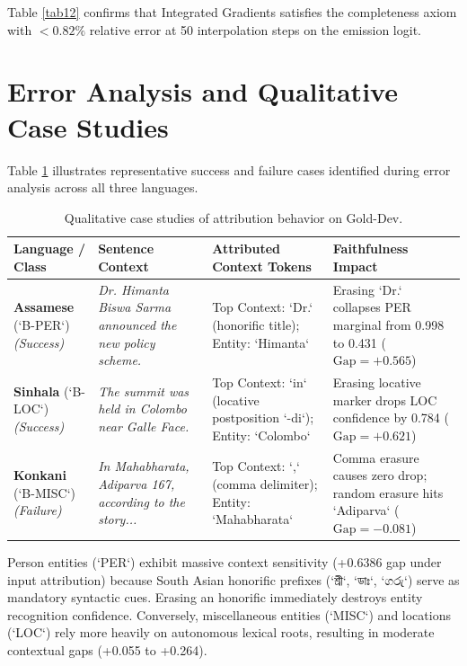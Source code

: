 \documentclass[default,iicol]{sn-jnl}
\begin{document}
Table \ref{tab12} confirms that Integrated Gradients satisfies the completeness axiom with $<0.82\%$ relative error at 50 interpolation steps on the emission logit.

\section{Error Analysis and Qualitative Case Studies}\label{sec7}

Table \ref{tab15} illustrates representative success and failure cases identified during error analysis across all three languages.

\begin{table}[t]
\caption{Qualitative case studies of attribution behavior on Gold-Dev.}\label{tab15}
\centering
\begin{tabular}{p{}p{}p{}p{}}
\toprule
Language / Class & Sentence Context & Attributed Context Tokens & Faithfulness Impact \\
\midrule
\textbf{Assamese} (`B-PER`) \textit{(Success)} & \textit{Dr. Himanta Biswa Sarma announced the new policy scheme.} & Top Context: `Dr.` (honorific title); Entity: `Himanta` & Erasing `Dr.` collapses PER marginal from 0.998 to 0.431 ($\text{Gap} = \mathbf{+0.565}$) \\
\textbf{Sinhala} (`B-LOC`) \textit{(Success)} & \textit{The summit was held in Colombo near Galle Face.} & Top Context: `in` (locative postposition `-di`); Entity: `Colombo` & Erasing locative marker drops LOC confidence by 0.784 ($\text{Gap} = \mathbf{+0.621}$) \\
\textbf{Konkani} (`B-MISC`) \textit{(Failure)} & \textit{In Mahabharata, Adiparva 167, according to the story...} & Top Context: `,` (comma delimiter); Entity: `Mahabharata` & Comma erasure causes zero drop; random erasure hits `Adiparva` ($\text{Gap} = \mathbf{-0.081}$) \\
\bottomrule
\end{tabular}
\end{table}

Person entities (`PER`) exhibit massive context sensitivity (+0.6386 gap under input attribution) because South Asian honorific prefixes (`শ্রী`, `ডাঃ`, `ගරු`) serve as mandatory syntactic cues. Erasing an honorific immediately destroys entity recognition confidence. Conversely, miscellaneous entities (`MISC`) and locations (`LOC`) rely more heavily on autonomous lexical roots, resulting in moderate contextual gaps (+0.055 to +0.264).
\end{document}

